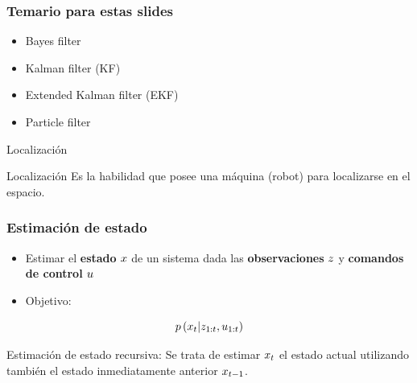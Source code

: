 \begin{frame}
    \frametitle{Temario para estas slides}
    
    \begin{itemize}
        \item Bayes filter
        \item Kalman filter (KF)
        \item Extended Kalman filter (EKF)
        \item Particle filter
    \end{itemize}
    
\end{frame}

\begin{frame}{Localización}
    \begin{block}{Localización}
        Es la habilidad que posee una máquina (robot) para localizarse en el espacio.
    \end{block}
\end{frame}


\begin{frame}
    \frametitle{Estimación de estado}
    
    
    \begin{itemize}
        \item  Estimar el \textbf{estado} $x$ de un sistema dada las \textbf{observaciones} $z$ y \textbf{comandos de control} $u$
        \item Objetivo:
    \end{itemize}
    
    \begin{equation}
        p\left(x_{t} | z_{1:t}, u_{1:t} \right)
    \end{equation}
    
    Estimación de estado recursiva: Se trata de estimar $x_{t}$ el estado actual utilizando también el estado inmediatamente anterior $x_{t-1}$.
\end{frame}

